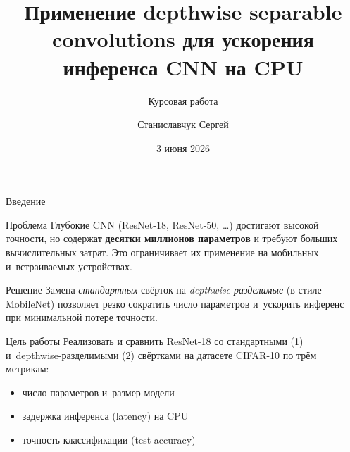 \documentclass[11pt,aspectratio=169]{beamer}
\title{Применение depthwise separable convolutions для ускорения инференса CNN на CPU}
\subtitle{Курсовая работа}
\author{Станиславчук Сергей}
\date{3 июня 2026}
\institute{}
\begin{document}
\maketitle

\begin{frame}{Введение}
  \begin{block}{Проблема}
    Глубокие CNN (ResNet-18, ResNet-50, \dots) достигают высокой точности,
    но содержат \textbf{десятки миллионов параметров} и требуют больших
    вычислительных затрат. Это ограничивает их применение на мобильных
    и~встраиваемых устройствах.
  \end{block}

  \pause

  \begin{block}{Решение}
    Замена \textit{стандартных} свёрток на \textit{depthwise-разделимые}
    (в стиле MobileNet) позволяет резко сократить число параметров
    и~ускорить инференс при минимальной потере точности.
  \end{block}

  \pause

  \begin{block}{Цель работы}
    Реализовать и сравнить ResNet-18 со стандартными (1) и~depthwise-разделимыми (2)
    свёртками на датасете CIFAR-10 по трём метрикам:
    \begin{itemize}
      \item число параметров и~размер модели
      \item задержка инференса (latency) на CPU
      \item точность классификации (test accuracy)
    \end{itemize}
  \end{block}
\end{frame}
\end{document}
